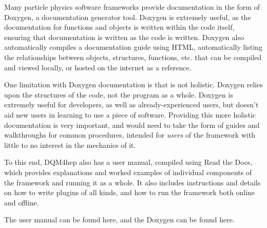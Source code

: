 Many particle physics software frameworks provide documentation in the form of Doxygen, a documentation generator tool. Doxygen is extremely useful, as the documentation for functions and objects is written within the code itself, ensuring that documentation is written as the code is written. Doxygen also automatically compiles a documentation guide using HTML, automatically listing the relationships between objects, structures, functions, etc. that can be compiled and viewed locally, or hosted on the internet as a reference.

One limitation with Doxygen documentation is that is not holistic. Doxygen relies upon the structures of the code, not the program as a whole. Doxygen is extremely useful for developers, as well as already-experienced users, but doesn't aid new users in learning to use a piece of software. Providing this more holistic documentation is very important, and would need to take the form of guides and walkthroughs for common procedures, intended for \emph{users} of the framework with little to no interest in the mechanics of it.

To this end, DQM4hep also has a user manual, compiled using Read the Docs, which provides explanations and worked examples of individual components of the framework and running it as a whole. It also includes instructions and details on how to write plugins of all kinds, and how to run the framework both online and offline. 

The user manual can be found here\cite{dqm4hep-user-manual}, and the Doxygen can be found here\cite{dqm4hep-doxygen}.


